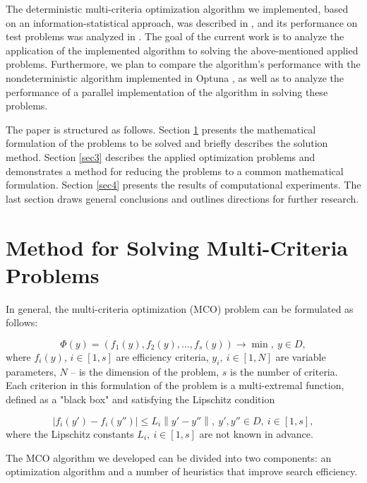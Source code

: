 \documentclass[a4paper]{llncs}
\begin{document}
The deterministic multi-criteria optimization algorithm we implemented, based on an information-statistical approach, was described in \cite{MCO_ML_2023,Konnov2025}, and its performance on test problems was analyzed in \cite{Konnov2025_ruscd}. The goal of the current work is to analyze the application of the implemented algorithm to solving the above-mentioned applied problems. Furthermore, we plan to compare the algorithm's performance with the nondeterministic algorithm implemented in Optuna \cite{Akiba2019Optuna}, as well as to analyze the performance of a parallel implementation of the algorithm in solving these problems.

The paper is structured as follows. Section \ref{sec2} presents the mathematical formulation of the problems to be solved and briefly describes the solution method. Section \ref{sec3} describes the applied optimization problems and demonstrates a method for reducing the problems to a common mathematical formulation. Section \ref{sec4} presents the results of computational experiments. The last section draws general conclusions and outlines directions for further research.


\section{Method for Solving Multi-Criteria Problems}
\label{sec2}

In general, the multi-criteria optimization (MCO) problem can be formulated as follows:

\begin{equation}
\Phi(y) = \left( f_{1}(y), f_{2}(y), \dots, f_{s}(y) \right) \rightarrow \min,\ y \in D,
\label{eq:mco_problem}
\end{equation}
where $f_{i}(y)$, $i \in [1,s]$ are efficiency criteria, $y_{i},\ i \in [1,N]$ are variable parameters, $N$ -- is the dimension of the problem, $s$ is the number of criteria. Each criterion in this formulation of the problem is a multi-extremal function, defined as a "black box" and satisfying the Lipschitz condition

\begin{equation}
\left| f_{i}\left( y' \right) - f_{i}\left( y'' \right) \right| \leq L_{i}\left\| y' - y'' \right\|,\ y',y'' \in D,\ i \in [1,s],
\label{eq:lipschitz}
\end{equation}
where the Lipschitz constants $L_{i},\ i \in [1,s]$ are not known in advance.

The MCO algorithm we developed can be divided into two components: an optimization algorithm and a number of heuristics that improve search efficiency.
\end{document}
